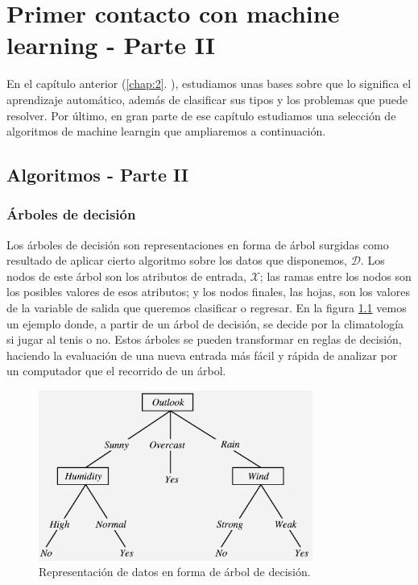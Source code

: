 \chapter{Primer contacto con machine learning - Parte II} \label{chap:3}

\vspace*{5mm}

En el capítulo anterior (\ref{chap:2}. ), estudiamos unas bases sobre que lo significa el aprendizaje automático, además de clasificar sus tipos y los problemas que puede resolver. Por último, en gran parte de ese capítulo estudiamos una selección de algoritmos de machine learngin que ampliaremos a continuación.

\section{Algoritmos - Parte II} \label{sec:3.1}

\subsection{Árboles de decisión} \label{subsec:3.1.1}

Los árboles de decisión son representaciones en forma de árbol surgidas como resultado de aplicar cierto algoritmo sobre los datos que disponemos, $\mathcal{D}$. Los nodos de este árbol son los atributos de entrada, $\mathcal{X}$; las ramas entre los nodos son los posibles valores de esos atributos; y los nodos finales, las hojas, son los valores de la variable de salida que queremos clasificar o regresar. En la figura \ref{fig:3.1} vemos un ejemplo donde, a partir de un árbol de decisión, se decide por la climatología si jugar al tenis o no. Estos árboles se pueden transformar en reglas de decisión, haciendo la evaluación de una nueva entrada más fácil y rápida de analizar por un computador que el recorrido de un árbol.

\begin{figure}[ht]
  \centering
  \includegraphics[width=90mm]{figures/ch_03/decision_tree_example.png}
  \caption{Representación de datos en forma de árbol de decisión. \cite{vidal2009decision}}
  \label{fig:3.1}
\end{figure}

